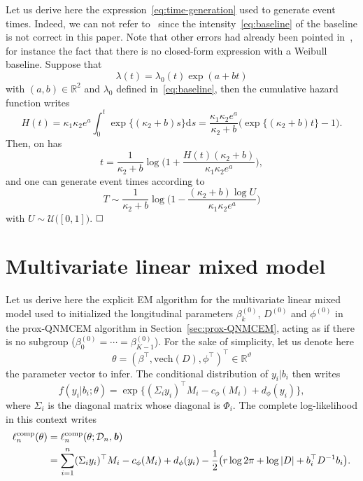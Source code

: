 \documentclass[11pt]{article}
\newcommand{\dd}{\mathrm{d}}
\newcommand{\cD}{\mathcal D}
\newcommand{\cU}{\mathcal U}
\newcommand{\R}{\mathds R}
\begin{document}
Let us derive here the expression~\eqref{eq:time-generation} used to generate event times. Indeed, we can not refer to~\citet{austin2012generating} since the intensity~\eqref{eq:baseline} of the baseline is not correct in this paper.
Note that other errors had already been pointed in~\citep{austin2013correction}, for instance the fact that there is no closed-form expression with a Weibull baseline.
Suppose that
\[\lambda(t) = \lambda_0(t) \exp (a + b t)\]
with $(a, b) \in \R^2$ and $\lambda_0$ defined in~\eqref{eq:baseline}, then the cumulative hazard function writes
\[H(t) = \kappa_1 \kappa_2 e^a \int_0^t \exp\{(\kappa_2 + b)s \} \dd s = \dfrac{\kappa_1 \kappa_2 e^a}{\kappa_2 + b} \big( \exp\{(\kappa_2 + b) t\} - 1 \big).\]
Then, on has
\[t = \dfrac{1}{\kappa_2 + b} \log \Big( 1 + \dfrac{H(t)(\kappa_2 + b)}{\kappa_1 \kappa_2 e^a} \Big),\]
and one can generate event times according to
\[ T \sim \dfrac{1}{\kappa_2 + b} \log \Big( 1 - \dfrac{(\kappa_2 + b)\log U}{\kappa_1 \kappa_2 e^a} \Big) \]
with $U \sim \cU\big([0,1]\big)$.
$\hfill\square$

\section{Multivariate linear mixed model}
\label{sec:MLMM}

Let us derive here the explicit EM algorithm for the multivariate linear mixed model used to initialized the longitudinal parameters $\beta_k^{(0)}$, $D^{(0)}$ and $\phi^{(0)}$ in the prox-QNMCEM algorithm in Section~\ref{sec:prox-QNMCEM}, acting as if there is no subgroup ($\beta_0^{(0)} = \cdots = \beta_{K-1}^{(0)}$). 
For the sake of simplicity, let us denote here 
\[\theta = (\beta^\top, \text{vech}(D), \phi^\top)^\top \in \R^\vartheta\]
the parameter vector to infer.
The conditional distribution of $y_i|b_i$ then writes
\[f(y_i|b_i ; \theta) = \exp \big\{( \Sigma_iy_i)^\top M_{i} - c_\phi(M_{i}) + d_\phi(y_i) \big\},\]
where $\Sigma_i$ is the diagonal matrix whose diagonal is $\Phi_i$. 
The complete log-likelihood in this context writes
\begin{align*}
\ell_n^\text{comp}(\theta) &= \ell_n^\text{comp}(\theta ; \cD_n, \textbf{\textit{b}}) \\
&= \sum_{i=1}^n (\Sigma_iy_i)^\top M_{i} - c_\phi(M_{i}) + d_\phi(y_i) -\dfrac12 \big(r \log 2\pi + \log|D| + b_i^\top D^{-1}b_i\big).
\end{align*}
  
\end{document}
